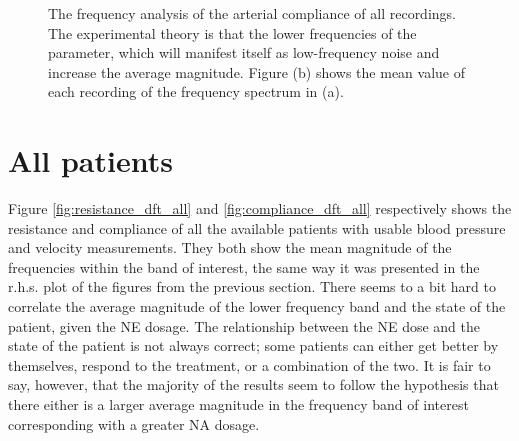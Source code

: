 \begin{figure}[h]
  \centering
      \hfill
  \caption{The frequency analysis of the arterial compliance of all recordings. The experimental theory is that the lower frequencies of the parameter, which will manifest itself as low-frequency noise and increase the average magnitude. Figure (b) shows the mean value of each recording of the frequency spectrum in (a).}
  \label{fig:compliance_dft}
\end{figure}

\newpage

\section{All patients}

Figure \ref{fig:resistance_dft_all} and \ref{fig:compliance_dft_all} respectively shows the resistance and compliance of all the available patients with usable blood pressure and velocity measurements. They both show the mean magnitude of the frequencies within the band of interest, the same way it was presented in the r.h.s. plot of the figures from the previous section. There seems to a bit hard to correlate the average magnitude of the lower frequency band and the state of the patient, given the NE dosage. The relationship between the NE dose and the state of the patient is not always correct; some patients can either get better by themselves, respond to the treatment, or a combination of the two. It is fair to say, however, that the majority of the results seem to follow the hypothesis that there either is a larger average magnitude in the frequency band of interest corresponding with a greater NA dosage.

